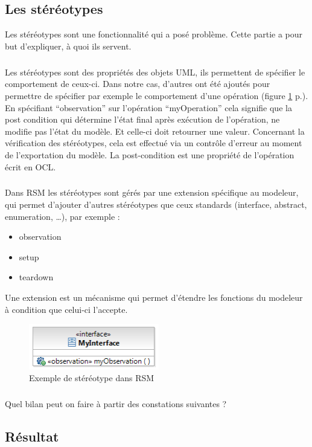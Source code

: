 \subsection{Les stéréotypes}

Les stéréotypes sont une fonctionnalité qui a posé problème.
Cette partie a pour but d'expliquer, à quoi ils servent.

\subparagraph*{}
Les stéréotypes sont des propriétés des objets UML, ils permettent de spécifier le comportement de ceux-ci. 
Dans notre cas, d'autres ont été ajoutés pour permettre de spécifier par exemple le comportement d'une opération (figure \ref{stereotype} p.\pageref{stereotype}). 
En spécifiant ``observation'' sur l'opération ``myOperation'' cela signifie que la post condition qui détermine l'état final après exécution de l'opération, ne modifie pas l'état du modèle. 
Et celle-ci doit retourner une valeur. 
Concernant la vérification des stéréotypes, cela est effectué via un contrôle d'erreur au moment de l'exportation du modèle. 
La post-condition est une propriété de l'opération écrit en OCL.

\subparagraph{}
Dans RSM les stéréotypes sont gérés par une extension spécifique au modeleur, qui permet d'ajouter d'autres stéréotypes que ceux standards (interface, abstract, enumeration, \ldots), par exemple : 
\begin{itemize}
  \item observation
  \item setup
  \item teardown
\end{itemize}
Une extension est un mécanisme qui permet d'étendre les fonctions du modeleur à condition que celui-ci l'accepte.

\begin{figure}[!h]
\begin{center}
  \includegraphics[height=2cm]{images/stereotype.png}
  \caption{Exemple de stéréotype dans RSM}
  \label{stereotype}
\end{center}
\end{figure}

\subparagraph*{}
Quel bilan peut on faire à partir des constations suivantes ?

\subsection{Résultat}

